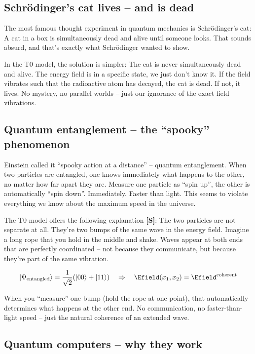 	\subsection{Schrödinger's cat lives -- and is dead}
	
	The most famous thought experiment in quantum mechanics is Schrödinger's cat: A cat in a box is simultaneously dead and alive until someone looks. That sounds absurd, and that's exactly what Schrödinger wanted to show.
	
	In the T0 model, the solution is simpler: The cat is never simultaneously dead and alive. The energy field is in a specific state, we just don't know it. If the field vibrates such that the radioactive atom has decayed, the cat is dead. If not, it lives. No mystery, no parallel worlds -- just our ignorance of the exact field vibrations.
	
	\subsection{Quantum entanglement -- the ``spooky'' phenomenon}
	
	Einstein called it ``spooky action at a distance'' -- quantum entanglement. When two particles are entangled, one knows immediately what happens to the other, no matter how far apart they are. Measure one particle as ``spin up'', the other is automatically ``spin down''. Immediately. Faster than light. This seems to violate everything we know about the maximum speed in the universe.
	
	The T0 model offers the following explanation \textbf{[S]}: The two particles are not separate at all. They're two bumps of the same wave in the energy field. Imagine a long rope that you hold in the middle and shake. Waves appear at both ends that are perfectly coordinated -- not because they communicate, but because they're part of the same vibration.
	
	\begin{equation}
		|\Psi_{\text{entangled}}\rangle = \frac{1}{\sqrt{2}}(|00\rangle + |11\rangle) \quad \Rightarrow \quad \Efield(x_1, x_2) = \Efield^{\text{coherent}}
	\end{equation}
	
	When you ``measure'' one bump (hold the rope at one point), that automatically determines what happens at the other end. No communication, no faster-than-light speed -- just the natural coherence of an extended wave.
	
	\subsection{Quantum computers -- why they work}
	
